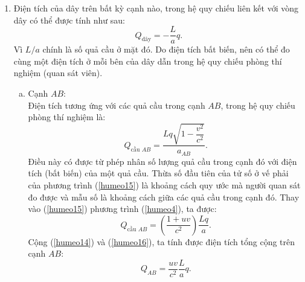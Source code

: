 \begin{loigiai}
\begin{enumerate}[1)]
\begin{enumerate}[a)]
    Dùng công thức biến đổi Lorentz, ta có:
\[\heva{x&=\dfrac{1}{\sqrt{1-\dfrac{v^{2}}{c^{2}}}}\left(x^{\prime}+v t^{\prime}\right),\\
y&=y',\\
z&=z',\\
t&=\dfrac{1}{\sqrt{1-\dfrac{v^{2}}{c^{2}}}}\left(t^{\prime}+\dfrac{x^{\prime} v}{c^{2}}\right).} \tag{8}\]
Theo đó, chúng ta có quả cầu đầu tiên trong hệ quy chiếu $S$:
\[
x_{1}=\dfrac{1}{\sqrt{1-\dfrac{v^{2}}{c^{2}}}} v t_{o}^{\prime} ;\ {y}_{1}=0 ;\ {z}_{1}=0 ;\ {t}_{1}=\dfrac{1}{\sqrt{1-\dfrac{{v}^{2}}{{c}^{2}}}} {t}_{0}^{\prime}. \tag{9}
\]
Và thứ hai:
\[
x_{2}=\dfrac{1}{\sqrt{1-\dfrac{v^{2}}{c^{2}}}} v t_{0}^{\prime} ;\ y_{2}=a ;\ z_{2}=0 ;\ t_{2}=\dfrac{1}{\sqrt{1-\dfrac{v^{2}}{c^{2}}}} t_{0}^{\prime}. \tag{10}
\]
Tại $t_1=t_2$, khoảng cách giữa các bóng được cho bởi:
\[
a_{D A}=\left(x_{2}-x_{1}\right)^{2}+\left(y_{2}-y_{1}\right)^{2}+\left(z_{2}-z_{1}\right)^{2}. \tag{11}
\]
Và vì vậy:
\[a_{DA}=a. \tag{12}\]
\item Cạnh $BC$:\\
Chúng ta làm tương tự như cạnh $DA$ và dễ dàng chứng minh được rằng:
\[a_{BC}=a.\tag{13}\]
\end{enumerate}
\item Điện tích của dây trên bất kỳ cạnh nào, trong hệ quy chiếu liên kết với vòng dây có thể được tính như sau:
\[
{Q}_\text{{dây}}=-\dfrac{{L}}{{a}} {q}. \tag{14} \label{humeo14}
\]
Vì $L/a$ chính là số quả cầu ở mặt đó. Do điện tích bất biến, nên có thể đo cùng một điện tích ở mỗi bên của dây dẫn trong hệ quy chiếu phòng thí nghiệm (quan sát viên).
\begin{enumerate}[a)]
    \item Cạnh $AB$:\\
    Điện tích tương ứng với các quả cầu trong cạnh $AB$, trong hệ quy chiếu phòng thí nghiệm là:
    \[
Q_{\text{cầu }AB}=\dfrac{Lq \sqrt{1-\dfrac{v^{2}}{c^{2}}}}{a_{A B}}. \tag{15} \label{humeo15}
\]
Điều này có được từ phép nhân số lượng quả cầu trong cạnh đó với điện tích (bất biến) của một quả cầu. Thừa số đầu tiên của tử số ở vế phải của phương trình (\ref{humeo15}) là khoảng cách quy ước mà người quan sát đo được và mẫu số là khoảng cách giữa các quả cầu trong cạnh đó. Thay vào (\ref{humeo15}) phương trình (\ref{humeo4}), ta được:
\[
{Q}_{\text{cầu }AB}=\left(\dfrac{1+{u v}}{{c}^{2}}\right) \dfrac{{Lq}}{{a}}. \tag{16} \label{humeo16}
\]
Cộng (\ref{humeo14}) và (\ref{humeo16}), ta tính được điện tích tổng cộng trên cạnh $AB$:
\[
{Q}_{{AB}}=\dfrac{{uv}}{{c}^{2}} \dfrac{{L}}{{a}} {q}. \tag{17} \label{humeo17}
\]
\end{enumerate}
\end{enumerate}
\end{loigiai}
